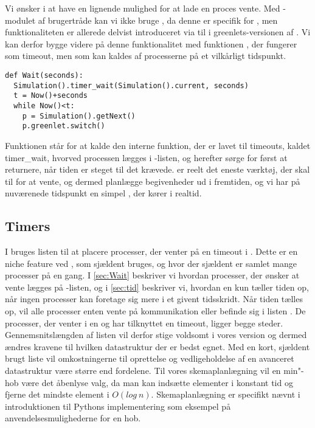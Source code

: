  Vi ønsker i \pycsp at have en lignende mulighed for at lade en proces vente. Med -modulet af brugertråde kan vi ikke bruge , da denne er specifik for , men funktionaliteten er allerede delvist introduceret via  til  i greenlets-versionen af \pycsp. Vi kan derfor bygge videre på denne funktionalitet med funktionen , der fungerer som timeout, men som kan kaldes af processerne på et vilkårligt tidspunkt.

\begin{lstlisting}[firstnumber=20,float=hbtp, label=fig:wait, caption=Wait i simulering-versionen.] 
def Wait(seconds):
  Simulation().timer_wait(Simulation().current, seconds)
  t = Now()+seconds
  while Now()<t:
    p = Simulation().getNext() 
    p.greenlet.switch()
\end{lstlisting}

Funktionen  står for at kalde den interne funktion, der er lavet til timeouts, kaldet timer\_wait, hvorved processen lægges i -listen, og herefter sørge for først at returnere, når tiden er steget til det krævede.  er reelt det eneste værktøj, der skal til for at vente, og dermed planlægge begivenheder ud i fremtiden, og vi har på nuværenede tidspunkt en simpel \des, der kører i realtid. 

\subsection{Timers}  
I \pycsp bruges listen  til at placere processer, der venter på en timeout i . Dette er en niche feature ved \pycsp, som  sjældent bruges, og hvor der sjældent er samlet mange processer på en gang. 
I \cref{sec:Wait} beskriver vi hvordan processer, der ønsker at vente lægges på -listen, og i \cref{sec:tid} beskriver vi, hvordan \sched en kun tæller tiden op, når ingen processer kan foretage sig mere i et givent tidsskridt. Når tiden tælles op, vil  alle processer enten vente på kommunikation eller befinde sig i listen . De processer, der venter i en  og har tilknyttet en timeout, ligger begge steder. Gennemsnitslængden af listen vil derfor stige voldsomt i vores version og dermed ændres kravene til hvilken  datastruktur der er bedst egnet. 
Med en kort, sjældent brugt liste vil omkostningerne til oprettelse og vedligeholdelse af en avanceret datastruktur være større end fordelene. Til vores skemaplanlægning  vil en min"-hob være det åbenlyse valg, da  man kan  indsætte elementer i konstant tid og fjerne det mindste element i $O(log\ n)$. Skemaplanlægning er specifikt nævnt i introduktionen til Pythons implementering\cite{heapq} som eksempel på anvendelsesmulighederne for en hob. 

